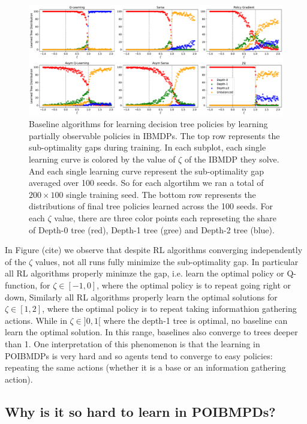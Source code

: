 \begin{figure}
    \centering
    \includegraphics[width=1\textwidth]{images/images_part1/tree_distributions.pdf}
    \caption{Baseline algorithms for learning decision tree policies by learning partially observable policies in IBMDPs. 
    The top row represents the sub-optimality gaps during training. In each subplot, each single learning curve is colored by the value of $\zeta$ of the IBMDP they solve. And each single learning curve represent the sub-optimality gap averaged over 100 seeds.
    So for each algortihm we ran a total of $200 \times 100$ single training seed.
    The bottom row represents the distributions of final tree policies learned across the 100 seeds.
    For each $\zeta$ value, there are three color points each represeting the share of Depth-0 tree (red), Depth-1 tree (gree) and Depth-2 tree (blue).
    }\label{fig:dt-distrib-poibmdp}
\end{figure}

In Figure (cite) we observe that despite RL algorithms converging independently of the $\zeta$ values, not all runs fully minimize the sub-optimality gap.
In particular all RL algorithms properly minimze the gap, i.e. learn the optimal policy or Q-function, for $\zeta \in [-1, 0]$, where the optimal policy is to repeat going right or down,
Similarly all RL algorithms properly learn the optimal solutions for $\zeta \in [1, 2]$, where the optimal policy is to repeat taking informathion gathering actions. 
While in $\zeta \in ]0, 1[$ where the depth-1 tree is optimal, no baseline can learn the optimal solution. 
In this range, baselines also converge to trees deeper than 1.
One interpretation of this phenomenon is that the learning in POIBMDPs is very hard and so agents tend to converge to easy policies: repeating the same actions (whether it is a base or an information gathering action). 


\subsection{Why is it so hard to learn in POIBMPDs?}

